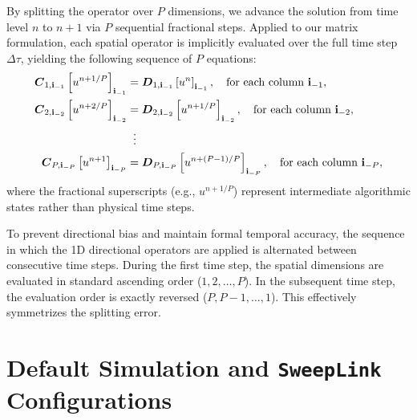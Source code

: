 \documentclass{article}
\def\C{\mbox{\boldmath $C$}}
\def\D{\mbox{\boldmath $D$}}
\newcommand{\SweepLink}{\texttt{SweepLink}\xspace}
\begin{document}
By splitting the operator over $P$ dimensions, we advance the solution from time level $n$ to $n+1$ via $P$ sequential fractional steps. Applied to our matrix formulation, each spatial operator is implicitly evaluated over the full time step $\Delta \tau$, yielding the following sequence of $P$ equations:
\begin{align*}
    \C_{1, \mathbf{i}_{-1}} \left[u^{n+1/P}\right]_{\mathbf{i}_{-1}} &= \D_{1, \mathbf{i}_{-1}} \left[u^n\right]_{\mathbf{i}_{-1}},\quad \text{for each column } \mathbf{i}_{-1}, \\
    \C_{2, \mathbf{i}_{-2}} \left[u^{n+2/P}\right]_{\mathbf{i}_{-2}} &= \D_{2, \mathbf{i}_{-2}} \left[u^{n+1/P}\right]_{\mathbf{i}_{-2}},\quad \text{for each column } \mathbf{i}_{-2}, \\
    & \;\; \vdots \\
    \C_{P, \mathbf{i}_{-P}} \left[u^{n+1}\right]_{\mathbf{i}_{-P}} &= \D_{P, \mathbf{i}_{-P}} \left[u^{n+(P-1)/P}\right]_{\mathbf{i}_{-P}},\quad \text{for each column } \mathbf{i}_{-P},
\end{align*}
where the fractional superscripts (e.g., $u^{n+1/P}$) represent intermediate algorithmic states rather than physical time steps.

To prevent directional bias and maintain formal temporal accuracy, the sequence in which the 1D directional operators are applied is alternated between consecutive time steps. During the first time step, the spatial dimensions are evaluated in standard ascending order ($1, 2, \dots, P$). In the subsequent time step, the evaluation order is exactly reversed ($P, P-1, \dots, 1$). This effectively symmetrizes the splitting error.

\section{Default Simulation and \SweepLink Configurations}
\label{supp:default-config}
\end{document}

